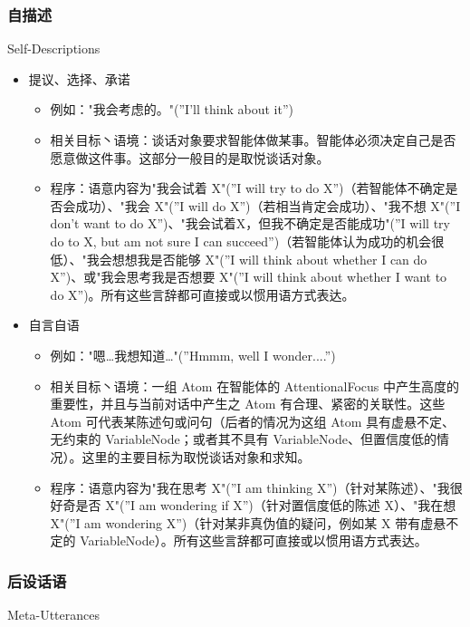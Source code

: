 \subsubsection{自描述}{Self-Descriptions}

\begin{itemize}

\item 提议、选择、承诺
\begin{itemize}
\item 例如："我会考虑的。"(”I’ll think about it”)
\item 相关目标丶语境：谈话对象要求智能体做某事。智能体必须决定自己是否愿意做这件事。这部分一般目的是取悦谈话对象。
\item 程序：语意内容为"我会试着 X"(”I will try to do X”)（若智能体不确定是否会成功）、"我会 X"(”I will do X”)（若相当肯定会成功）、"我不想 X"(”I don’t want to do X”)、"我会试着X，但我不确定是否能成功"(”I will try do to X, but am not sure I can succeed”)（若智能体认为成功的机会很低）、"我会想想我是否能够 X"(”I will think about whether I can do X”)、或"我会思考我是否想要 X"(”I will think about whether I want to do X”)。所有这些言辞都可直接或以惯用语方式表达。
\end{itemize}


\item 自言自语
\begin{itemize}
\item 例如："嗯…我想知道…"(”Hmmm, well I wonder....”)
\item 相关目标丶语境：一组 Atom 在智能体的 AttentionalFocus 中产生高度的重要性，并且与当前对话中产生之 Atom 有合理、紧密的关联性。这些 Atom 可代表某陈述句或问句（后者的情况为这组 Atom 具有虚悬不定、无约束的 VariableNode；或者其不具有 VariableNode、但置信度低的情况）。这里的主要目标为取悦谈话对象和求知。 
\item 程序：语意内容为"我在思考 X"(”I am thinking X”)（针对某陈述）、"我很好奇是否 X"(”I am wondering if X”)（针对置信度低的陈述 X）、"我在想 X"(”I am wondering X”)（针对某非真伪值的疑问，例如某 X 带有虚悬不定的 VariableNode）。所有这些言辞都可直接或以惯用语方式表达。
\end{itemize}

\end{itemize}

\subsubsection{后设话语}{Meta-Utterances}

